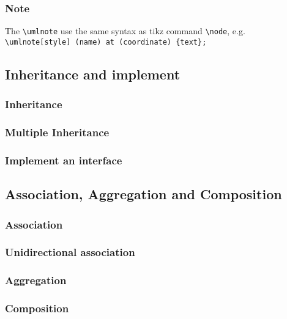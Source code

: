 \documentclass{article}
\newcommand{\demo}[2][1]{
\begin{minipage}{.49\linewidth}
\centering
\resizebox{#1\linewidth}{!}{

}
\end{minipage}
\hspace{0.01\linewidth}
\begin{minipage}{.5\linewidth}

\end{minipage}
}
\begin{document}
\subsubsection{Note}
The \lstinline|\umlnote| use the same syntax as tikz command
\lstinline|\node|, e.g. \lstinline|\umlnote[style] (name) at (coordinate) {text};|

\demo[0.7]{note}

\subsection{Inheritance and implement}
\subsubsection{Inheritance}
\demo{inheritance}
\subsubsection{Multiple Inheritance}
\demo{multiple-inheritance}
 
\subsubsection{Implement an interface}
\demo{implement-interface}

\subsection{Association, Aggregation and Composition}
\subsubsection{Association} 
\demo{association}
 
\subsubsection{Unidirectional association}
\demo{unidirectional-association}

\subsubsection{Aggregation}
\demo{aggregation}

\subsubsection{Composition}
\demo{composition}
\end{document}
